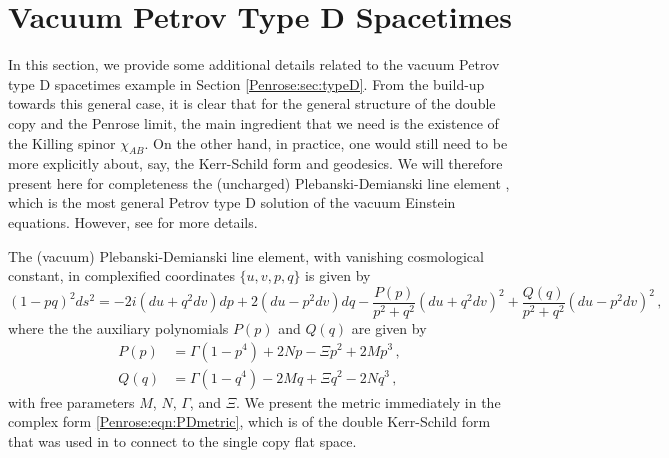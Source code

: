\section{Vacuum Petrov Type D Spacetimes}\label{Penrose:app:PlebanskiDemianski}

In this section, we provide some additional details related to the vacuum Petrov type D spacetimes example in Section \ref{Penrose:sec:typeD}. From the build-up towards this general case, it is clear that for the general structure of the double copy and the Penrose limit, the main ingredient that we need is the existence of the Killing spinor $\chi_{AB}$. On the other hand, in practice, one would still need to be more explicitly about, say, the Kerr-Schild form and geodesics. We will therefore present here for completeness the (uncharged) Plebanski-Demianski line element \cite{Kinnersley:1969zza,Plebanski:1976gy}, which is the most general Petrov type D solution of the vacuum Einstein equations. However, see \cite{Griffiths:2005qp} for more details.

The (vacuum) Plebanski-Demianski line element, with vanishing cosmological constant, in complexified coordinates $\lbrace u,v,p,q \rbrace$ is given by
\begin{equation}\label{Penrose:eqn:PDmetric}
(1-pq)^2 ds^2 = -2i (du+q^2 dv)dp +2(du-p^2 dv)dq - \frac{P(p)}{p^2+q^2}(du+q^2 dv)^2 +\frac{Q(q)}{p^2+q^2}(du-p^2 dv)^2 \, ,
\end{equation}
where the the auxiliary polynomials $P(p)$ and $Q(q)$ are given by
\begin{equation}
\begin{aligned}
P(p) &= \Gamma (1-p^4) +2 N p -\Xi p^2 + 2M p^3 \, ,  \\
Q(q) &= \Gamma (1-q^4) -2 M q + \Xi q^2 - 2N q^3 \, , 
\end{aligned}
\end{equation}
with free parameters $M$, $N$, $\Gamma$, and $\Xi$. We present the metric immediately in the complex form \eqref{Penrose:eqn:PDmetric}, which is of the double Kerr-Schild form that was used in \cite{Luna:2018dpt} to connect to the single copy flat space.

